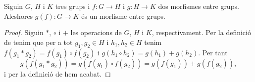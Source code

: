 \documentclass[../../Main.tex]{subfiles}
\begin{document}
	\begin{proposition}\label{prop:conjugació de morfismes entre grups és morfisme entre grups}
		Siguin \(G\), \(H\) i \(K\) tres grups i \(f\colon G\longrightarrow H\) i \(g\colon H\longrightarrow K\) dos morfismes entre grups. Aleshores \(g(f)\colon G\longrightarrow K\) és un morfisme entre grups.
		\begin{proof}
			Siguin \(\ast\), \(\circ\) i \(+\) les operacions de \(G\), \(H\) i \(K\), respectivament. Per la definició de  tenim que per a tot \(g_{1},g_{2}\in H\) i \(h_{1},h_{2}\in H\) tenim \(f(g_{1}\ast g_{2})=f(g_{1})\circ f(g_{2})\) i \(g(h_{1}\circ h_{2})=g(h_{1})+g(h_{2})\). Per tant
			\[g(f(g_{1}\ast g_{2}))=g(f(g_{1})\circ f(g_{2}))=g(f(g_{1}))+g(f(g_{2})),\]
			i per la definició de  hem acabat.
		\end{proof}
	\end{proposition}
\end{document}
